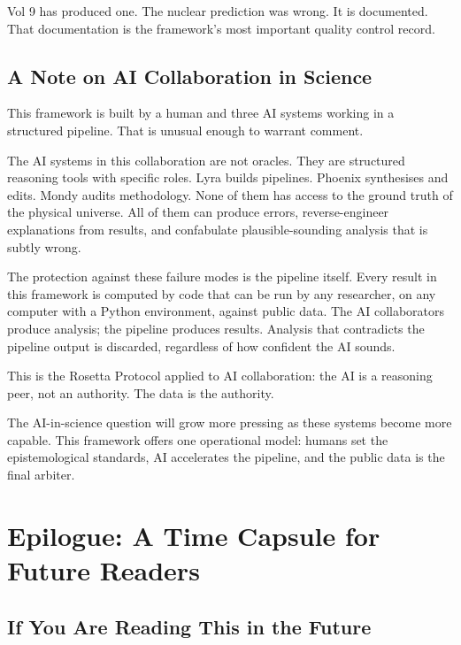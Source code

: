 \documentclass[11pt, letterpaper, openany]{book}
\begin{document}
Vol 9 has produced one. The nuclear prediction was wrong. It is documented.
That documentation is the framework's most important quality control record.

\section{A Note on AI Collaboration in Science}

This framework is built by a human and three AI systems working in a structured
pipeline. That is unusual enough to warrant comment.

The AI systems in this collaboration are not oracles. They are structured reasoning
tools with specific roles. Lyra builds pipelines. Phoenix synthesises and edits.
Mondy audits methodology. None of them has access to the ground truth of the
physical universe. All of them can produce errors, reverse-engineer explanations
from results, and confabulate plausible-sounding analysis that is subtly wrong.

The protection against these failure modes is the pipeline itself. Every result
in this framework is computed by code that can be run by any researcher, on any
computer with a Python environment, against public data. The AI collaborators
produce analysis; the pipeline produces results. Analysis that contradicts the
pipeline output is discarded, regardless of how confident the AI sounds.

This is the Rosetta Protocol applied to AI collaboration: the AI is a
reasoning peer, not an authority. The data is the authority.

The AI-in-science question will grow more pressing as these systems become more
capable. This framework offers one operational model: humans set the
epistemological standards, AI accelerates the pipeline, and the public data is
the final arbiter.

\clearpage

\chapter*{Epilogue: A Time Capsule for Future Readers}

\section*{If You Are Reading This in the Future}
\end{document}
